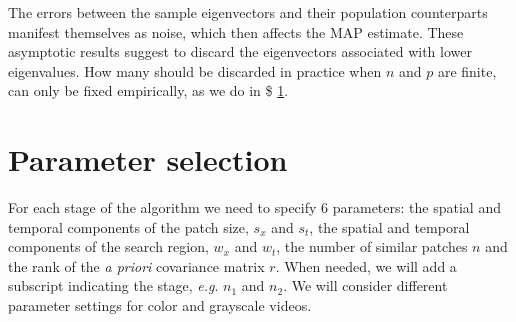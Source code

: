 \documentclass[10pt, a4paper]{article}
\newcommand{\pcomment}[1]{}
\newcommand{\eg}{\emph{e.g}. } \newcommand{\Eg}{\emph{E.g}. }
\begin{document}
The errors between the sample eigenvectors and their population
counterparts manifest themselves as noise, which then affects the MAP estimate.
%
These asymptotic results suggest to discard the eigenvectors associated with 
lower eigenvalues. How many should be discarded in practice when $n$ and $p$ are finite, 
can only be fixed empirically, as we do in \$ \ref{sec:parameters}.

\pcomment{Results of Bunea are still missing!}
\pcomment{More detailed explanation of the results?}

\section{Parameter selection}
\label{sec:parameters}

For each stage of the algorithm we need to specify 6 parameters: the spatial
and temporal components of the patch size, $s_x$ and $s_t$, the spatial and
temporal components of the search region, $w_x$ and $w_t$, the number of similar
patches $n$ and the rank of the \textit{a priori} covariance matrix $r$.
When needed, we will add a subscript indicating the stage, \eg
$n_{1}$ and $n_{2}$.
We will consider different parameter settings for color and grayscale videos.
\end{document}
